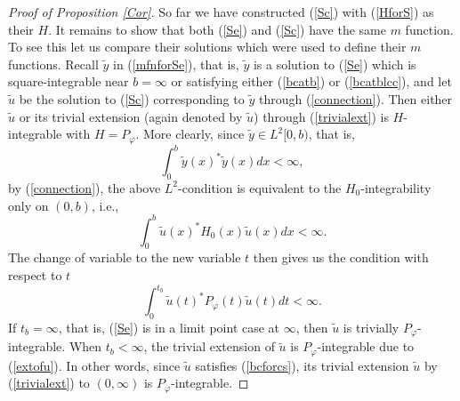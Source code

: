 \documentclass[preprint,12pt]{elsarticle}
\begin{document}
\begin{proof}[Proof of Proposition \ref{Cor}]
So far we have constructed (\ref{Sc}) with (\ref{HforS}) as their $H$. It remains to show that both (\ref{Se}) and (\ref{Sc}) have the same $m$ function. To see this let us compare their solutions which were used to define their $m$ functions. Recall $\tilde{y}$ in (\ref{mfnforSe}), that is, $\tilde{y}$ is a solution to (\ref{Se}) which is square-integrable near $b=\infty$ or satisfying either (\ref{bcatb}) or (\ref{bcatblcc}), and let $\tilde{u}$ be the solution to (\ref{Sc}) corresponding to $\tilde{y}$ through (\ref{connection}). Then either $\tilde{u}$ or its trivial extension (again denoted by $\tilde{u}$)  through (\ref{trivialext}) is $H$-integrable with $H=P_{\varphi}$. More clearly, since $\tilde{y} \in L^2[0,b)$, that is, 
\begin{equation*}
\int_0^{b} \tilde{y}(x)^{*}\tilde{y}(x) dx<\infty, 
\end{equation*}
by (\ref{connection}), the above $L^2$-condition is equivalent to the $H_0$-integrability only on $(0,b)$, i.e., 
\begin{equation*}
\int_0^{b} \tilde{u}(x)^*H_0(x) \tilde{u}(x) dx<\infty. 
\end{equation*}
 The change of variable to the new variable $t$ then gives us the condition with respect to $t$ 
\begin{equation*}
\int_0^{t_b} \tilde{u}(t)^*P_{\varphi}(t) \tilde{u}(t) dt<\infty. 
\end{equation*}
If $t_b=\infty$, that is, (\ref{Se}) is in a limit point case at $\infty$, then $\tilde{u}$ is trivially $P_{\varphi}$-integrable. When $t_b<\infty$, the trivial extension of $\tilde{u}$ is $P_{\varphi}$-integrable due to (\ref{extofu}). In other words, since $\tilde{u}$ satisfies (\ref{bcforcs}), its trivial extension $\tilde{u}$ by (\ref{trivialext}) to $(0,\infty)$  is $P_{\varphi}$-integrable. 


\end{proof}
\end{document}
